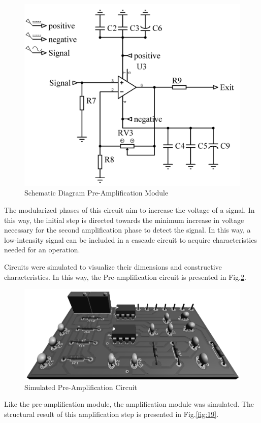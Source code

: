 \documentclass{ws-m3as}
\begin{document}
\begin{figure}[H]
	\centering  
	\includegraphics[width=0.6\linewidth]{Figures/SchematicAmp}
	\caption{Schematic Diagram Pre-Amplification Module}
	\label{fig:8}
\end{figure}

The modularized phases of this circuit aim to increase the voltage of a signal. In this way, the initial step is directed towards the minimum increase in voltage necessary for the second amplification phase to detect the signal. In this way, a low-intensity signal can be included in a cascade circuit to acquire characteristics needed for an operation.

Circuits were simulated to visualize their dimensions and constructive characteristics. In this way, the Pre-amplification circuit is presented in Fig.\ref{fig:18}.

\begin{figure}[H]
	\centering  
	\includegraphics[width=1\linewidth]{Figures/Preamp3D2}
	\caption{Simulated Pre-Amplification Circuit }
	\label{fig:18}
\end{figure}

Like the pre-amplification module, the amplification module was simulated. The structural result of this amplification step is presented in Fig.\ref{fig:19}.
\end{document}
